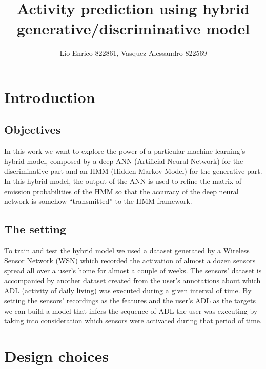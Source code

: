 \documentclass[10pt,a4paper]{article}
\title{Activity prediction using hybrid generative/discriminative model}
\author{Lio Enrico 822861, Vasquez Alessandro 822569}
\begin{document}
	\maketitle
	\newpage
	\section{Introduction}
	\subsection{Objectives}
	In this work we want to explore the power of a particular machine learning's hybrid model, composed by a deep ANN (Artificial Neural Network) for the discriminative part and an HMM (Hidden Markov Model) for the generative part. In this hybrid model, the output of the ANN is used to refine the matrix of emission probabilities of the HMM so that the accuracy of the deep neural network is somehow ``transmitted'' to the HMM framework.
	\subsection{The setting}
	To train and test the hybrid model we used a dataset generated by a Wireless Sensor Network (WSN) which recorded the activation of almost a dozen sensors spread all over a user's home for almost a couple of weeks. The sensors' dataset is accompanied by another dataset created from the user's annotations about which ADL (activity of daily living) was executed during a given interval of time. By setting the sensors' recordings as the features and the user's ADL as the targets we can build a model that infers the sequence of ADL the user was executing by taking into consideration which sensors were activated during that period of time. 
	
	\section{Design choices}
\end{document}
